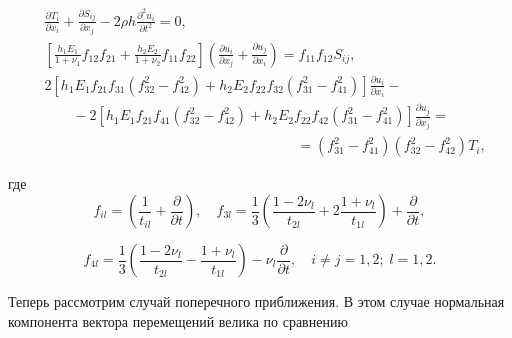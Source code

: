 \begin{equation}

\label{anofr:eq_10}

\begin{aligned}

&\frac{\partial T_i}{\partial x_i} +\frac{\partial S_{ij}}{\partial x_j} -2\rho h\frac{\partial^2 u_i}{\partial t^2} =0, \\

&\left[\frac{h_1 E_1}{1+\nu _1} f_{12} f_{21} +\frac{h_2 E_2}{1+\nu _2} f_{11} f_{22} \right]\left(\frac{\partial u_i}

{\partial x_j} +\frac{\partial u_j}{\partial x_i} \right)=f_{11} f_{12} S_{ij}, \\

&2\left[h_1 E_1 f_{21} f_{31} \left(f_{32}^2 -f_{42}^2 \right)+h_2 E_2 f_{22} f_{32} \left(f_{31}^2 -f_{41}^2 \right)\right]

\frac{\partial u_i}{\partial x_i} - \\

&\qquad  -2\left[h_1 E_1 f_{21} f_{41} \left(f_{32}^2 -f_{42}^2 \right)+h_2 E_2 f_{22} f_{42} \left(f_{31}^2 - f_{41}^2 \right)\right]

\frac{\partial u_j}{\partial x_j} =  \\

&\qquad \qquad \qquad \qquad \qquad \qquad \qquad \qquad \qquad = \left(f_{31}^2 -f_{41}^2 \right)\left(f_{32}^2 -f_{42}^2 \right)T_i,

\end{aligned}

\end{equation}

где $$f_{il} =\left(\frac{1}{t_{il}} +\frac{\partial }{\partial t} \right),\quad 

f_{3l} =\frac{1}{3} \left(\frac{1-2\nu _l}{t_{2l}} + 2\frac{1+\nu _l}{t_{1l}} \right)+\frac{\partial }{\partial t},$$

$$f_{4l} =\frac{1}{3} \left(\frac{1-2\nu _{l}}{t_{2l}} -\frac{1+\nu_{l}}{t_{1l}} \right)-\nu _{l} \frac{\partial }{\partial t} ,\quad 

i\ne j=1, 2; \;l=1, 2.$$



\smallskip




Теперь рассмотрим случай поперечного приближения. В этом случае нормальная компонента вектора перемещений велика по сравнению

